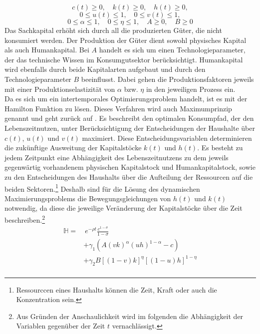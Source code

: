 		\vspace{-0.3cm}
		\begin{displaymath} c(t)\geq 0,\quad k(t)\geq 0,\quad h(t)\geq 0, \end{displaymath}
	\begin{displaymath} 0\leq u(t)\leq 1,\quad 0\leq v(t) \leq1, \end{displaymath}
\begin{displaymath} 0\leq \alpha\leq 1,\quad 0\leq \eta \leq1, \quad A\geq 0, \quad B\geq 0\end{displaymath}
%
Das Sachkapital erhöht sich durch all die produzierten Güter, die nicht konsumiert werden. Der Produktion der Güter dient sowohl physisches Kapital als auch Humankapital. Bei $A$ handelt es sich um einen Technologieparameter, der das technische Wissen im Konsumgutsektor berücksichtigt. Humankapital wird ebenfalls durch beide Kapitalarten aufgebaut und durch den Technologieparameter $B$ beeinflusst. Dabei gehen die Produktionsfaktoren jeweils mit einer Produktionselastizität von $\alpha$ bzw. $\eta$ in den jeweiligen Prozess ein.\\
%
Da es sich um ein intertemporales Optimierungsproblem handelt, ist es mit der Hamilton Funktion zu lösen. Dieses Verfahren wird auch Maximumprinzip genannt und geht zurück auf \cite{Pontryagin.1964}. Es beschreibt den optimalen Konsumpfad, der den Lebenszeitnutzen, unter Berücksichtigung der Entscheidungen der Haushalte über $c(t)$, $u(t)$ und $v(t)$ maximiert. Diese Entscheidungsvariablen determinieren die zukünftige Ausweitung der Kapitalstöcke $k(t)$ und $h(t)$. Es besteht zu jedem Zeitpunkt eine Abhängigkeit des Lebenszeitnutzens zu dem jeweils gegenwärtig vorhandenem physischen Kapitalstock und Humankapitalstock, sowie zu den Entscheidungen des Haushalts über die Aufteilung der Ressourcen auf die beiden Sektoren.\footnote{Ressourccen eines Haushalts können die Zeit, Kraft oder auch die Konzentration sein.} Deshalb sind für die Lösung des dynamischen Maximierungsproblems die Bewegungsgleichungen von $h(t)$ und $k(t)$ notwendig, da diese die jeweilige Veränderung der Kapitalstöcke über die Zeit beschreiben.\footnote{Aus Gründen der Anschaulichkeit wird im folgenden die Abhängigkeit der Variablen gegenüber der Zeit $t$ vernachlässigt.}
%
\begin{equation}
	\begin{split}
		\mathbb{H}=&~e^{-\rho t}\frac{c^{1-\sigma}}{1-\sigma}\\
%
		&+\gamma_1(A(vk)^\alpha(uh)^{1-\alpha}-c)\\
%
		&+\gamma_2B[(1-v)k]^{\eta}[(1-u)h]^{1-\eta}\\
%
	\end{split}
\end{equation}
